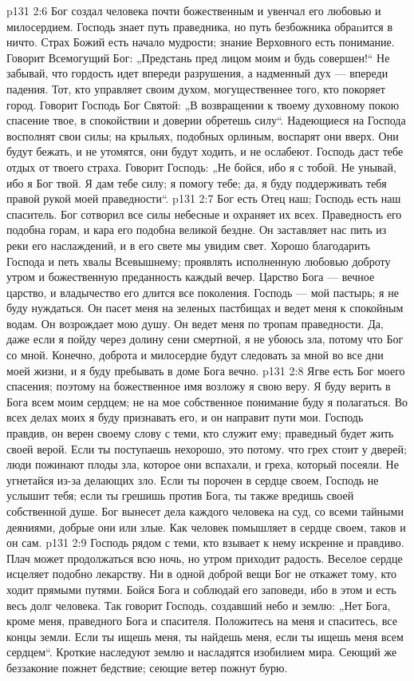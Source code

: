 \vs p131 2:6 Бог создал человека почти божественным и увенчал его любовью и милосердием. Господь знает путь праведника, но путь безбожника обраnится в ничто. Страх Божий есть начало мудрости; знание Верховного есть понимание. Говорит Всемогущий Бог: „Предстань пред лицом моим и будь совершен!“ Не забывай, что гордость идет впереди разрушения, а надменный дух --- впереди падения. Тот, кто управляет своим духом, могущественнее того, кто покоряет город. Говорит Господь Бог Святой: „В возвращении к твоему духовному покою спасение твое, в спокойствии и доверии обретешь силу“. Надеющиеся на Господа восполнят свои силы; на крыльях, подобных орлиным, воспарят они вверх. Они будут бежать, и не утомятся, они будут ходить, и не ослабеют. Господь даст тебе отдых от твоего страха. Говорит Господь: „Не бойся, ибо я с тобой. Не унывай, ибо я Бог твой. Я дам тебе силу; я помогу тебе; да, я буду поддерживать тебя правой рукой моей праведности“.
\vs p131 2:7 Бог есть Отец наш; Господь есть наш спаситель. Бог сотворил все силы небесные и охраняет их всех. Праведность его подобна горам, и кара его подобна великой бездне. Он заставляет нас пить из реки его наслаждений, и в его свете мы увидим свет. Хорошо благодарить Господа и петь хвалы Всевышнему; проявлять исполненную любовью доброту утром и божественную преданность каждый вечер. Царство Бога --- вечное царство, и владычество его длится все поколения. Господь --- мой пастырь; я не буду нуждаться. Он пасет меня на зеленых пастбищах и ведет меня к спокойным водам. Он возрождает мою душу. Он ведет меня по тропам праведности. Да, даже если я пойду через долину сени смертной, я не убоюсь зла, потому что Бог со мной. Конечно, доброта и милосердие будут следовать за мной во все дни моей жизни, и я буду пребывать в доме Бога вечно.
\vs p131 2:8 Ягве есть Бог моего спасения; поэтому на божественное имя возложу я свою веру. Я буду верить в Бога всем моим сердцем; не на мое собственное понимание буду я полагаться. Во всех делах моих я буду признавать его, и он направит пути мои. Господь правдив, он верен своему слову с теми, кто служит ему; праведный будет жить своей верой. Если ты поступаешь нехорошо, это потому. что грех стоит у дверей; люди пожинают плоды зла, которое они вспахали, и греха, который посеяли. Не угнетайся из\hyp{}за делающих зло. Если ты порочен в сердце своем, Господь не услышит тебя; если ты грешишь против Бога, ты также вредишь своей собственной душе. Бог вынесет дела каждого человека на суд, со всеми тайными деяниями, добрые они или злые. Как человек помышляет в сердце своем, таков и он сам.
\vs p131 2:9 Господь рядом с теми, кто взывает к нему искренне и правдиво. Плач может продолжаться всю ночь, но утром приходит радость. Веселое сердце исцеляет подобно лекарству. Ни в одной доброй вещи Бог не откажет тому, кто ходит прямыми путями. Бойся Бога и соблюдай его заповеди, ибо в этом и есть весь долг человека. Так говорит Господь, создавший небо и землю: „Нет Бога, кроме меня, праведного Бога и спасителя. Положитесь на меня и спаситесь, все концы земли. Если ты ищешь меня, ты найдешь меня, если ты ищешь меня всем сердцем“. Кроткие наследуют землю и насладятся изобилием мира. Сеющий же беззаконие пожнет бедствие; сеющие ветер пожнут бурю.
